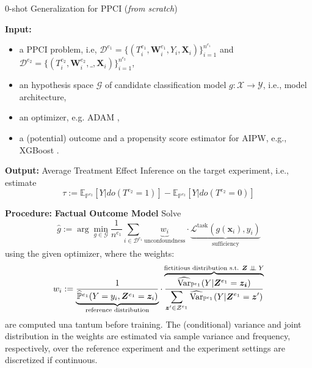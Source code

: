 \begin{algorithm*}[h!]
\caption{0-shot Generalization for PPCI (\textit{from scratch})}
\begin{algorithmic}[1] %
\label{alg:ppcifull}
    \STATE \textbf{Input:} 
    \begin{itemize}
    \setlength\itemsep{0em}
        \item a PPCI problem, i.e, $\mathcal{D}^{e_1}=\{(T^{e_1}_i, \bm{W}^{e_1}_i, Y_i, \bm{X}_i)\}_{i=1}^{n^{e_1}}$  and  $\mathcal{D}^{e_2}=\{(T^{e_2}_i, \bm{W}^{e_2}_i, \_, \bm{X}_i)\}_{i=1}^{n^{e_2}}$,
        \item an hypothesis space $\mathcal{G}$ of candidate classification model $g:\mathcal{X}\rightarrow \mathcal{Y}$, i.e., model architecture,
        \item an optimizer, e.g. ADAM \citep{kingma2014adam},
        \item a (potential) outcome and a propensity score estimator for AIPW, e.g., XGBoost \citep{chen2016xgboost}.
    \end{itemize}
    \medskip
    \STATE \textbf{Output:} Average Treatment Effect Inference on the target experiment, i.e., estimate
    \begin{equation}
        \tau:=\mathbb{E}_{\mathbb{P}^{e_2}}[Y|do(T^{e_2}=1)]-\mathbb{E}_{\mathbb{P}^{e_2}}[Y|do(T^{e_2}=0)]
    \end{equation}
    
    \bigskip
    \STATE \textbf{Procedure:} 
    \STATE \qquad \textbf{Factual Outcome Model}
    Solve
    \begin{equation}
        \hat{g}:=\arg \min_{g \in \mathcal{G}} \frac{1}{n^{e_1}}\sum_{i\in \mathcal{D}^{e_1}} \underbrace{w_i}_{\text{unconfoundness}}\cdot\underbrace{\mathcal{L}^{\text{task}}(g(\bm{x}_i), y_i)}_{\text{sufficiency}}
    \end{equation}
    using the given optimizer, where the weights:
     \begin{equation}
            w_i :=\underbrace{\frac{1}{\widehat{\mathbb{P}}^{e_1}(Y=y_i, \bm{Z}^{e_1}=\bm{z}_i)}}_{\text{reference distribution}} \cdot \overbrace{\frac{\widehat{\text{Var}}_{\mathbb{P}^{e_1}}(Y|\bm{Z}^{e_1}=\bm{z_i})}{\displaystyle\sum_{\bm{z}'\in \mathcal{Z}^{e_1}} \widehat{\text{Var}}_{\mathbb{P}^{e_1}}(Y|\bm{Z}^{e_1}=\bm{z}')}}^{\text{fictitious distribution s.t. $\bm{Z} \perp\!\!\!\perp Y$}}
        \end{equation}
    are computed una tantum before training. The (conditional) variance and joint distribution in the weights are estimated via sample variance and frequency, respectively, over the reference experiment and the experiment settings are discretized if continuous.


\end{algorithmic}
\end{algorithm*}
